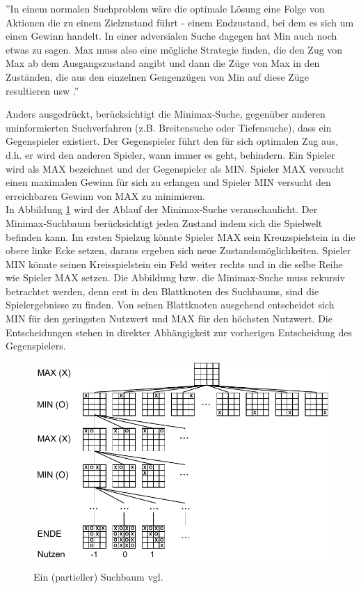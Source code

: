 ''In einem normalen Suchproblem wäre die optimale Lösung eine Folge von Aktionen die zu einem Zielzustand führt - einem Endzustand, bei dem es sich um einen Gewinn handelt. In einer adversialen Suche dagegen hat Min auch noch etwas zu sagen. Max muss also eine mögliche Strategie finden, die den Zug von Max ab dem Ausgangszustand angibt und dann die Züge von Max in den Zuständen, die aus den einzelnen Gengenzügen von Min auf diese Züge resultieren usw \cite[208]{Russell}.''

Anders ausgedrückt, berücksichtigt die Minimax-Suche, gegenüber anderen uninformierten Suchverfahren (z.B. Breitensuche oder Tiefensuche), dass ein Gegenspieler existiert. Der Gegenspieler führt den für sich optimalen Zug aus, d.h. er wird den anderen Spieler, wann immer es geht, behindern. Ein Spieler wird als MAX bezeichnet und der Gegenspieler als MIN. Spieler MAX versucht einen maximalen Gewinn für sich zu erlangen und Spieler MIN versucht den erreichbaren Gewinn von MAX zu minimieren.\\

In Abbildung \ref{fig:minimax_tictactoe} wird der Ablauf der Minimax-Suche veranschaulicht. Der Minimax-Suchbaum berücksichtigt jeden Zustand indem sich die Spielwelt befinden kann. Im ersten Spielzug könnte Spieler MAX sein Kreuzspielstein in die obere linke Ecke setzen, daraus ergeben sich neue Zustandsmöglichkeiten. Spieler MIN könnte seinen Kreisspielstein ein Feld weiter rechts und in die selbe Reihe wie Spieler MAX setzen. Die Abbildung bzw. die Minimax-Suche muss rekursiv betrachtet werden, denn erst in den Blattknoten des Suchbaums, sind die Spielergebnisse zu finden. Von seinen Blattknoten ausgehend entscheidet sich MIN für den geringsten Nutzwert und MAX für den höchsten Nutzwert. Die Entscheidungen stehen in direkter Abhängigkeit zur vorherigen Entscheidung des Gegenspielers. \\
  
\begin{figure}[!htbp]
  \centering
  \includegraphics{inhalt/abbildungen/minimax_tictactoe.pdf}
  \caption{Ein (partieller) Suchbaum vgl. \cite[208]{Russell}}
  \label{fig:minimax_tictactoe}
\end{figure} 

